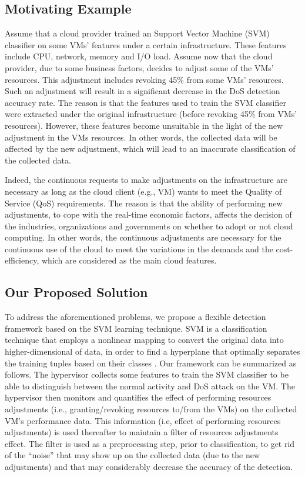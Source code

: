 \documentclass[twocolumn]{bmcart}%
\begin{document}
\subsection*{Motivating Example}
Assume that a cloud provider trained an Support Vector Machine (SVM) classifier on some VMs’ features under a certain infrastructure. These features include CPU, network, memory and I/O load. Assume now that the cloud provider, due to some business factors, decides to adjust some of the VMs' resources. This adjustment includes revoking 45\% from some VMs' resources. Such an adjustment will result in a significant decrease in the DoS detection accuracy rate. The reason is that the features used to train the SVM classifier were extracted under the original infrastructure (before revoking 45\% from VMs' resources). However, these features become unsuitable in the light of the new adjustment in the VMs resources. In other words, the collected data will be affected by the new adjustment, which will lead to an inaccurate classification of the collected data.

Indeed, the continuous requests to make adjustments on the infrastructure are necessary as long as the cloud client (e.g., VM) wants to meet the Quality of Service (QoS) requirements. The reason is that the ability of performing new adjustments, to cope with the real-time economic factors, affects the decision of the industries, organizations and governments on whether to adopt or not cloud computing. In other words, the continuous adjustments are necessary for the continuous use of the cloud to meet the variations in the demands and the cost-efficiency, which are considered as the main cloud features.

\subsection*{Our Proposed Solution}
To address the aforementioned problems, we propose a flexible detection framework based on the SVM learning technique. SVM is a classification technique that employs a nonlinear mapping to convert the original data into higher-dimensional of data, in order to find a hyperplane that optimally separates the training tuples based on their classes \cite{han2011data}. Our framework can be summarized as follows. The hypervisor collects some features to train the SVM classifier to be able to distinguish between the normal activity and DoS attack on the VM. The hypervisor then monitors and quantifies the effect of performing resources adjustments (i.e., granting/revoking resources to/from the VMs) on the collected VM's performance data. This information (i.e, effect of performing resources adjustments) is used thereafter to maintain a filter of resources adjustments effect. The filter is used as a preprocessing step, prior to classification, to get rid of the ``noise'' that may show up on the collected data (due to the new adjustments) and that may considerably decrease the accuracy of the detection.
\end{document}

